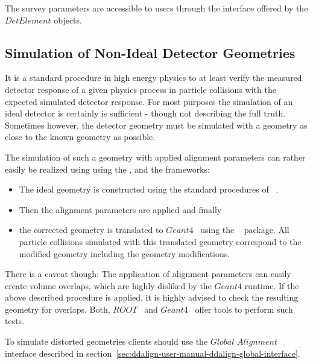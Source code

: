 \documentclass[10pt,a4paper]{article}
\begin{document}
\noindent 
The survey parameters are accessible to users
through the interface offered by the $DetElement$ objects.

\subsection{Simulation of Non-Ideal Detector Geometries}
\label{subsect:ddalign-intro-simulate-misaligned-geometries}
\noindent
It is a standard procedure in high energy physics to at least verify 
the measured detector response of a given physics process in particle 
collisions with the expected simulated detector response.
For most purposes the simulation of an ideal detector is certainly is
sufficient - though not describing the full truth. Sometimes however, the
detector geometry must be simulated with a geometry as close to the 
known geometry as possible.

\noindent
The simulation of such a geometry with applied alignment parameters can 
rather easily be realized using using the \DDhep, \DDA and the \DDG frameworks:
\begin{itemize}\itemcompact
\item The ideal geometry is constructed using the standard procedures
    of \DDhep~\cite{bib:DD4hep}.
\item Then the alignment parameters are applied and finally
\item the corrected geometry is translated to $Geant4$~\cite{bib:geant4}
    using the \DDG~\cite{bib:DDG4} package.
    All particle collisions simulated with this translated geometry 
    correspond to the modified geometry including the geometry
    modifications.
\end{itemize}
There is a caveat though: The application of alignment parameters can
easily create volume overlaps, which are highly disliked by the $Geant4$ 
runtime. If the above described procedure is applied, it is highly advised 
to check the resulting geometry for overlaps. Both, 
$ROOT$~\cite{bib:ROOT-tgeo} and $Geant4$~\cite{bib:geant4} offer tools 
to perform such tests.

\noindent
To simulate distorted geometries clients should use the 
$Global$ $Alignment$  interface described in 
section~\ref{sec:ddalign-user-manual-ddalign-global-interface}.

\newpage
\end{document}
